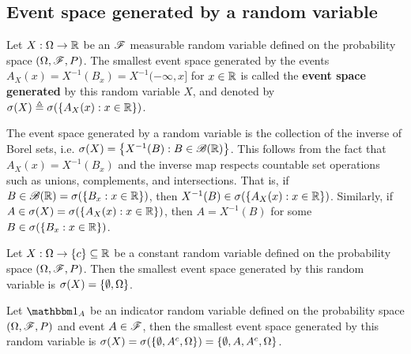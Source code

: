\documentclass[letterpaper,10pt,english]{article}
\begin{document}
\subsection{Event space generated by a random variable}
\begin{defn} 
Let $X: \Omega \to \mathbb{R}$ be an $\mathscr{F}$ measurable random variable defined on the probability space $(\Omega, \mathscr{F}, P)$. 
The smallest event space generated by the events $A_X(x) = X^{-1}(B_x) = X^{-1}(-\infty, x]$ for $x \in \mathbb{R}$ is called the \textbf{event space generated} by this random variable $X$, 
and denoted by $\sigma(X) \triangleq \sigma(\left\{A_X(x): x \in \mathbb{R}\right\})$. 
\end{defn}
\begin{rem}
The event space generated by a random variable is the collection of the inverse of Borel sets, i.e. $\sigma(X) = \left\{X^{-1}(B): B \in \mathscr{B}(\mathbb{R})\right\}$.
This follows from the fact that $A_X(x) = X^{-1}(B_x)$ and the inverse map respects countable set operations such as unions, complements, and intersections. 
That is, if $B \in \mathscr{B}(\mathbb{R}) = \sigma(\left\{B_x:x\in \mathbb{R}\right\})$, then $X^{-1}(B) \in \sigma(\left\{A_X(x): x \in \mathbb{R}\right\})$. 
Similarly, if $A \in \sigma(X) = \sigma(\left\{A_X(x): x \in \mathbb{R}\right\})$, then $A = X^{-1}(B)$ for some $B \in \sigma(\left\{B_x: x \in \mathbb{R}\right\})$.  
\end{rem}
\begin{shaded}
\begin{exmp} 
Let $X:\Omega \to \left\{c\right\} \subseteq \mathbb{R}$ be a constant random variable defined on the probability space $(\Omega,\mathscr{F},P)$.  
Then the smallest event space generated by this random variable is 
$\sigma(X) = \left\{\emptyset, \Omega\right\}$. 
\end{exmp}
\begin{exmp} 
Let $\Ind{A}$ be an indicator random variable defined on the probability space $(\Omega,\mathscr{F},P)$ and event $A \in \mathscr{F}$, 
then the smallest event space generated by this random variable is 
$\sigma(X) = \sigma(\left\{\emptyset, A^c, \Omega\right\}) = \left\{\emptyset, A, A^c, \Omega\right\}$. 
\end{exmp}
\end{shaded}
\end{document}

